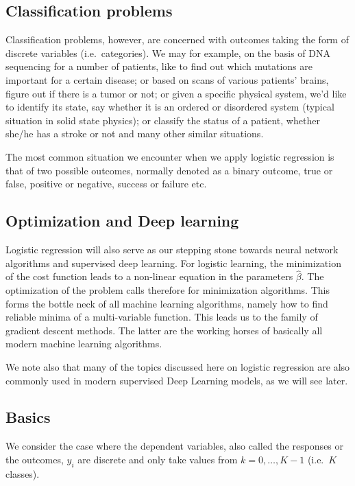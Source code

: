 \documentclass[%
oneside,                 %
final,                   %
10pt]{article}
\begin{document}
\subsection{Classification problems}


Classification problems, however, are concerned with outcomes taking
the form of discrete variables (i.e.~categories). We may for example,
on the basis of DNA sequencing for a number of patients, like to find
out which mutations are important for a certain disease; or based on
scans of various patients' brains, figure out if there is a tumor or
not; or given a specific physical system, we'd like to identify its
state, say whether it is an ordered or disordered system (typical
situation in solid state physics); or classify the status of a
patient, whether she/he has a stroke or not and many other similar
situations.

The most common situation we encounter when we apply logistic
regression is that of two possible outcomes, normally denoted as a
binary outcome, true or false, positive or negative, success or
failure etc.

\subsection{Optimization and Deep learning}

Logistic regression will also serve as our stepping stone towards
neural network algorithms and supervised deep learning. For logistic
learning, the minimization of the cost function leads to a non-linear
equation in the parameters $\hat{\beta}$. The optimization of the
problem calls therefore for minimization algorithms. This forms the
bottle neck of all machine learning algorithms, namely how to find
reliable minima of a multi-variable function. This leads us to the
family of gradient descent methods. The latter are the working horses
of basically all modern machine learning algorithms.

We note also that many of the topics discussed here on logistic 
regression are also commonly used in modern supervised Deep Learning
models, as we will see later.


\subsection{Basics}

We consider the case where the dependent variables, also called the
responses or the outcomes, $y_i$ are discrete and only take values
from $k=0,\dots,K-1$ (i.e.~$K$ classes).
\end{document}
